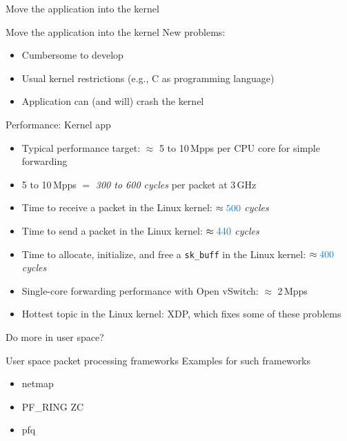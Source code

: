 \documentclass[NET,english,aspectratio=169,notitleframe]{tumbeamer}
\begin{document}

\begin{frame}{Move the application into the kernel}
\centering
\end{frame}

\begin{frame}{Move the application into the kernel}
New problems:
\begin{itemize}
\item Cumbersome to develop
\item Usual kernel restrictions (e.g., C as programming language)
\item Application can (and will) crash the kernel
\end{itemize}
\end{frame}

\begin{frame}{Performance: Kernel app}
\begin{itemize}
\item<1-> Typical performance target: $\approx$ 5 to 10\,Mpps per CPU core for simple forwarding
\item<1-> 5 to 10\,Mpps $=$ \emph{300 to 600 cycles} per packet at 3\,GHz
\vspace{1em}
\item<2-> Time to receive a packet in the Linux kernel: $\approx \emph{500}$ \emph{cycles}
\item<3-> Time to send a packet in the Linux kernel: $\approx \emph{440}$ \emph{cycles}
\item<4-> Time to allocate, initialize, and free a \texttt{sk\_buff} in the Linux kernel: $\approx \emph{400}$ \emph{cycles}
\vspace{1em}
\item<5-> Single-core forwarding performance with Open vSwitch: $\approx$ 2\,Mpps
\item<5-> Hottest topic in the Linux kernel: XDP, which fixes some of these problems
\end{itemize}
\end{frame}


\begin{frame}{Do more in user space?}
\end{frame}

\begin{frame}{User space packet processing frameworks}
Examples for such frameworks
\begin{itemize}
\item netmap
\item PF\_RING ZC
\item pfq
\end{itemize}
\end{frame}
\end{document}
